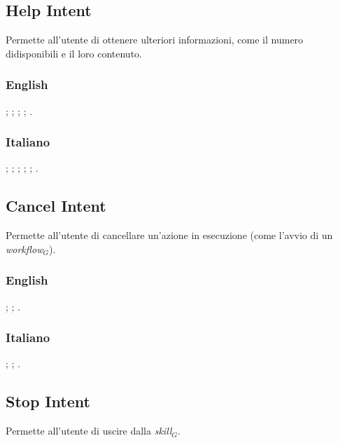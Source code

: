 \subsection{Help Intent}\label{help}
Permette all'utente di ottenere ulteriori informazioni, come il numero didisponibili e il loro contenuto.
\subsubsection{English}
\begin{itemize}
	;
	;
	;
	;
	.	
\end{itemize}
\subsubsection{Italiano}
\begin{itemize}
	;
	;
	;
	;
	;
	.
\end{itemize}

\subsection{Cancel Intent}
Permette all'utente di cancellare un'azione in esecuzione (come l'avvio di un \textit{workflow$_{G}$}).
\subsubsection{English}
\begin{itemize}
	;
	;
	.
\end{itemize}

\subsubsection{Italiano}
\begin{itemize}
	;
	;
	.
\end{itemize}

\subsection{Stop Intent}
Permette all'utente di uscire dalla \textit{skill$_{G}$}.
